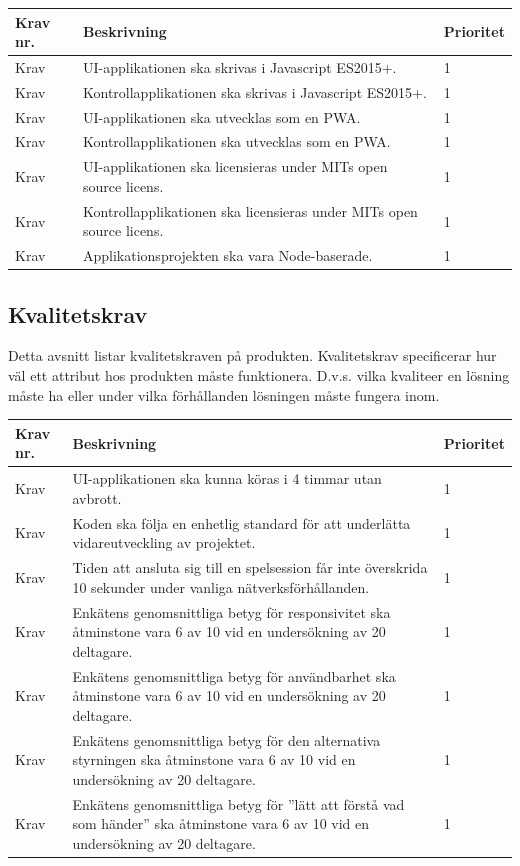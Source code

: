\documentclass[10pt]{article}
\newcounter{indexcounter}
\newcommand{\Krav}[2]{
	\stepcounter{indexcounter}
	Krav \arabic{indexcounter} & #1 & #2 \\ \hline
}
\begin{document}
	\begin{tabular}{| p{2cm} | p{8cm} | p{2cm}|}
		\hline
		\textbf{Krav nr.} & \textbf{Beskrivning} & \textbf{Prioritet} \\ \hline
		
		\Krav{UI-applikationen ska skrivas i Javascript ES2015+.}{1}
		\Krav{Kontrollapplikationen ska skrivas i Javascript ES2015+.}{1}
		\Krav{UI-applikationen ska utvecklas som en PWA.}{1}
		\Krav{Kontrollapplikationen ska utvecklas som en PWA.}{1}
		\Krav{UI-applikationen ska licensieras under MITs open source licens.}{1}
		\Krav{Kontrollapplikationen ska licensieras under MITs open source licens.}{1}
		\Krav{Applikationsprojekten ska vara Node-baserade.}{1}
		
	\end{tabular}
\pagebreak
	\subsection{Kvalitetskrav}
	Detta avsnitt listar kvalitetskraven på produkten. Kvalitetskrav specificerar hur väl ett attribut hos produkten måste funktionera. D.v.s. vilka kvaliteer en lösning måste ha eller under vilka förhållanden lösningen måste fungera inom.  \\
	
		\begin{tabular}{|p{2cm}|p{8cm}|p{2cm}|}
		\hline
		\textbf{Krav nr.} & \textbf{Beskrivning} & \textbf{Prioritet} \\ \hline
		
		\Krav{UI-applikationen ska kunna köras i 4 timmar utan avbrott.}{1}
		\Krav{Koden ska följa en enhetlig standard\cite{bib-kvalitetsplan} för att underlätta vidareutveckling av projektet.}{1}
		\Krav{Tiden att ansluta sig till en spelsession får inte överskrida 10 sekunder under vanliga nätverksförhållanden.}{1}
        \Krav{Enkätens\cite{bib-kvalitetsplan} genomsnittliga betyg för responsivitet ska åtminstone vara 6 av 10 vid en undersökning av 20 deltagare.}{1}
		\Krav{Enkätens\cite{bib-kvalitetsplan} genomsnittliga betyg för användbarhet ska åtminstone vara 6 av 10 vid en undersökning av 20 deltagare.}{1}
		\Krav{Enkätens\cite{bib-kvalitetsplan} genomsnittliga betyg för den alternativa styrningen ska åtminstone vara 6 av 10 vid en undersökning av 20 deltagare.}{1}
		\Krav{Enkätens\cite{bib-kvalitetsplan} genomsnittliga betyg för ''lätt att förstå vad som händer'' ska åtminstone vara 6 av 10 vid en undersökning av 20 deltagare.}{1}
				
	\end{tabular}
	

\pagebreak

\printbibliography
{}
\end{document}
